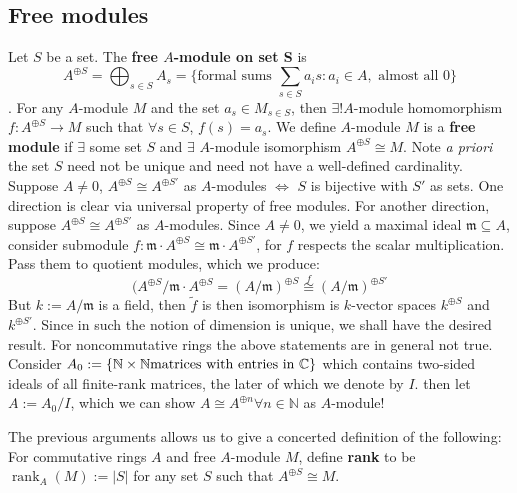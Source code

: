 \documentclass[12pt]{article}
\theoremstyle{definition}
\theoremstyle{plain}
\DeclareMathOperator{\rank}{rank}
\newcommand{\nat}{\mathbb{N}}
\newcommand{\complex}{\mathbb{C}}
\renewcommand{\tilde}{\widetilde}
\begin{document}
\subsection{Free modules}
 \Def Let $S$ be a set. The \textbf{free $A$-module on set S} is
 $$A^{\oplus S}=\bigoplus_{s\in S} A_s=\{\text{formal sums }\sum_{s\in S}a_is: a_i\in A, \text{ almost all 0}\}$$.
  For any $A$-module $M$ and the set $a_s\in M_{s\in S}$, then $\exists ! A$-module homomorphism $f:A^{\oplus S}\to M$ such that $\forall s\in S$, $f(s)=a_s$.
 \Def We define $A$-module $M$ is a \textbf{free module} if $\exists $ some set $S$ and $\exists $ $A$-module isomorphism $A^{\oplus S}\cong M$.
 \Rmk Note \textit{a priori} the set $S$ need not be unique and need not have a well-defined cardinality.
 \Prop Suppose $A\neq 0$, $A^{\oplus S}\cong A^{\oplus S'}$ as $A$-modules $\iff$ $S$ is bijective with $S'$ as sets.
 \proof One direction is clear via universal property of free modules. For another direction, suppose $A^{\oplus S}\cong A^{\oplus S'}$ as $A$-modules. Since $A\neq 0$, we yield a maximal ideal $\mathfrak{m}\subseteq A$, consider submodule $f:\mathfrak{m}\cdot A^{\oplus S}\cong \mathfrak{m}\cdot A^{\oplus S'}$, for $f$ respects the scalar multiplication. Pass them to quotient modules, which we produce:
 $$(A^{\oplus S}/\mathfrak{m}\cdot A^{\oplus S}=(A/\mathfrak{m})^{\oplus S}\overset{f}{\cong} (A/\mathfrak{m})^{\oplus S'}$$
 But $k:=A/\mathfrak{m}$ is a field, then $\tilde{f}$ is then isomorphism is $k$-vector spaces $k^{\oplus S}$ and $k^{\oplus S'}$. Since in such the notion of dimension is unique, we shall have the desired result.
 \Rmk For noncommutative rings the above statements are in general not true. Consider $A_0:=\{\nat\times \nat\-\text{matrices with entries in }\complex\}$ which contains two-sided ideals of all finite-rank matrices, the later of which we denote by $I$. then let $A:=A_0/I$, which we can show $A\cong A^{\oplus n} \forall n\in \nat$ as $A$-module!

 \medskip
 The previous arguments allows us to give a concerted definition of the following:
 \Def For commutative rings $A$ and free $A$-module $M$, define \textbf{rank} to be $\rank_A(M):=|S|$ for any set $S$ such that $A^{\oplus S}\cong M$.

 \bigskip
\end{document}
